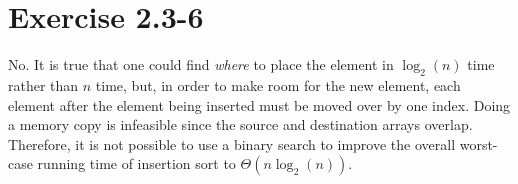 \documentclass{article}
\begin{document}
\section*{Exercise 2.3-6}

No. It is true that one could find \textit{where} to place the element in $\log_2(n)$ time rather than $n$ time, but, in order to make room for the new element, each element after the element being inserted must be moved over by one index. Doing a memory copy is infeasible since the source and destination arrays overlap. Therefore, it is not possible to use a binary search to improve the overall worst-case running time of insertion sort to $\Theta(n \log_2(n))$.
\end{document}
